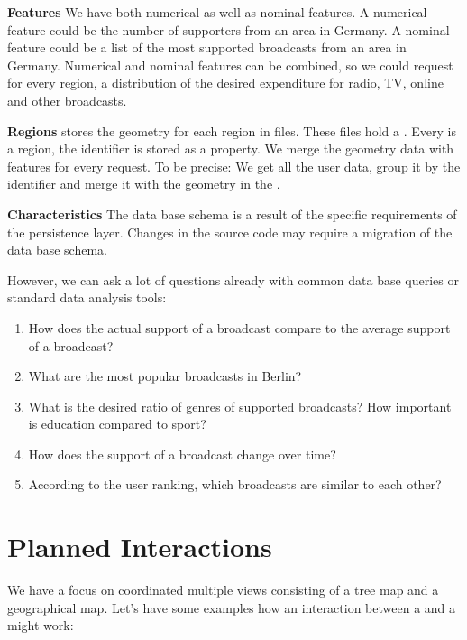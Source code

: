 \textbf{Features}
We have both numerical as well as nominal features.
A numerical feature could be the number of supporters from an area in Germany.
A nominal feature could be a list of the most supported broadcasts from an area in Germany.
Numerical and nominal features can be combined, so we could request for every region, a distribution of the desired expenditure for radio, TV, online and other broadcasts.

\textbf{Regions}
\rufu{} stores the geometry for each region in  files.
These files hold a .
Every  is a region, the identifier is stored as a property.
We merge the geometry data with features for every request.
To be precise: We get all the user data, group it by the identifier  and merge it with the geometry in the .

\textbf{Characteristics}
The data base schema is a result of the specific requirements of the persistence layer.
Changes in the source code may require a migration of the data base schema.

However, we can ask a lot of questions already with common data base queries or standard data analysis tools:
\begin{enumerate}
  \item
    How does the actual support of a broadcast compare to the average support of a broadcast?
  \item
    What are the most popular broadcasts in Berlin?
  \item
    What is the desired ratio of genres of supported broadcasts? How important is education compared to sport?
  \item
    How does the support of a broadcast change over time?
  \item
    According to the user ranking, which broadcasts are similar to each other?
\end{enumerate}



\section{Planned Interactions}
We have a focus on coordinated multiple views consisting of a tree map and a geographical map.
Let's have some examples how an interaction between a \tmap{} and a \map{} might work:

